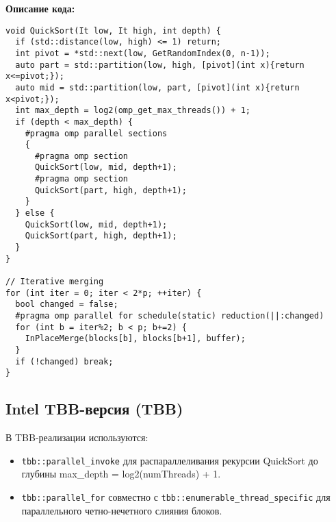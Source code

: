 \documentclass[12pt]{article}
\begin{document}
\noindent\textbf{Описание кода:}
\lstset{language=C++}
\begin{lstlisting}
void QuickSort(It low, It high, int depth) {
  if (std::distance(low, high) <= 1) return;
  int pivot = *std::next(low, GetRandomIndex(0, n-1));
  auto part = std::partition(low, high, [pivot](int x){return x<=pivot;});
  auto mid = std::partition(low, part, [pivot](int x){return x<pivot;});
  int max_depth = log2(omp_get_max_threads()) + 1;
  if (depth < max_depth) {
    #pragma omp parallel sections
    {
      #pragma omp section
      QuickSort(low, mid, depth+1);
      #pragma omp section
      QuickSort(part, high, depth+1);
    }
  } else {
    QuickSort(low, mid, depth+1);
    QuickSort(part, high, depth+1);
  }
}

// Iterative merging
for (int iter = 0; iter < 2*p; ++iter) {
  bool changed = false;
  #pragma omp parallel for schedule(static) reduction(||:changed)
  for (int b = iter%2; b < p; b+=2) {
    InPlaceMerge(blocks[b], blocks[b+1], buffer);
  }
  if (!changed) break;
}
\end{lstlisting}

\subsection{Intel TBB-версия (TBB)}
\hspace*{1.25em}В TBB-реализации используются:
\begin{itemize}
    \item \texttt{tbb::parallel\_invoke} для распараллеливания рекурсии QuickSort до глубины max\_depth = log2(numThreads) + 1.
    \item \texttt{tbb::parallel\_for} совместно с \texttt{tbb::enumerable\_thread\_specific} для параллельного четно-нечетного слияния блоков.
\end{itemize}
\end{document}
